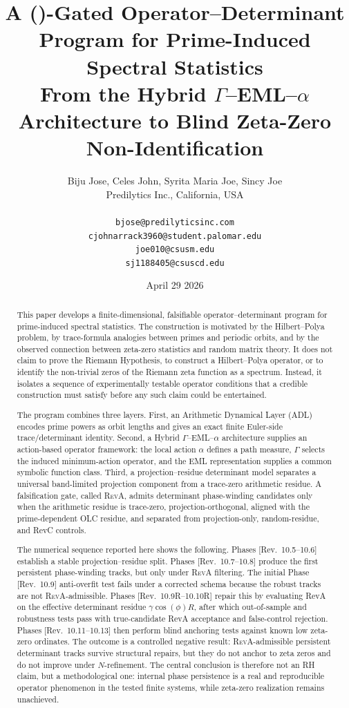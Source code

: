 \documentclass[11pt]{article}
\title{A \RevAFull{} (\RevA)-Gated Operator--Determinant Program for Prime-Induced Spectral Statistics\\
\large From the Hybrid $\Gamma$--EML--$\alpha$ Architecture to Blind Zeta-Zero Non-Identification}
\author{
Biju Jose, Celes John, Syrita Maria Joe, Sincy Joe\\
Predilytics Inc., California, USA\\[0.4em]
{\footnotesize
\begin{tabular}{c}
\texttt{bjose@predilyticsinc.com}\\
\texttt{cjohnarrack3960@student.palomar.edu}\\
\texttt{joe010@csusm.edu}\\
\texttt{sj1188405@csuscd.edu}
\end{tabular}
}
}
\date{April 29 2026}
\newcommand{\RevA}{\textsc{RevA}}
\newcommand{\revtag}[1]{\textnormal{[Rev.~#1]}}
\theoremstyle{definition}
\theoremstyle{plain}
\begin{document}
\maketitle

\begin{abstract}
This paper develops a finite-dimensional, falsifiable operator--determinant program for prime-induced spectral statistics.  The construction is motivated by the Hilbert--Polya problem, by trace-formula analogies between primes and periodic orbits, and by the observed connection between zeta-zero statistics and random matrix theory.  It does not claim to prove the Riemann Hypothesis, to construct a Hilbert--Polya operator, or to identify the non-trivial zeros of the Riemann zeta function as a spectrum.  Instead, it isolates a sequence of experimentally testable operator conditions that a credible construction must satisfy before any such claim could be entertained.

The program combines three layers.  First, an Arithmetic Dynamical Layer (ADL) encodes prime powers as orbit lengths and gives an exact finite Euler-side trace/determinant identity.  Second, a Hybrid $\Gamma$--EML--$\alpha$ architecture supplies an action-based operator framework: the local action $\alpha$ defines a path measure, $\Gamma$ selects the induced minimum-action operator, and the EML representation supplies a common symbolic function class.  Third, a projection--residue determinant model separates a universal band-limited projection component from a trace-zero arithmetic residue.  A falsification gate, called \RevA{}, admits determinant phase-winding candidates only when the arithmetic residue is trace-zero, projection-orthogonal, aligned with the prime-dependent OLC residue, and separated from projection-only, random-residue, and RevC controls.

The numerical sequence reported here shows the following.  Phases \revtag{10.5--10.6} establish a stable projection--residue split.  Phases \revtag{10.7--10.8} produce the first persistent phase-winding tracks, but only under \RevA{} filtering.  The initial Phase \revtag{10.9} anti-overfit test fails under a corrected schema because the robust tracks are not \RevA-admissible.  Phases \revtag{10.9R--10.10R} repair this by evaluating RevA on the effective determinant residue $\gamma\cos(\phi)R$, after which out-of-sample and robustness tests pass with true-candidate RevA acceptance and false-control rejection.  Phases \revtag{10.11--10.13} then perform blind anchoring tests against known low zeta-zero ordinates.  The outcome is a controlled negative result: \RevA-admissible persistent determinant tracks survive structural repairs, but they do not anchor to zeta zeros and do not improve under $N$-refinement.  The central conclusion is therefore not an RH claim, but a methodological one: internal phase persistence is a real and reproducible operator phenomenon in the tested finite systems, while zeta-zero realization remains unachieved.
\end{abstract}
\end{document}
